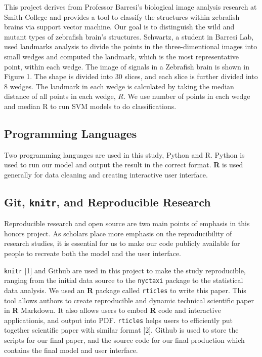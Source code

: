 \documentclass[10pt,letterpaper]{article}
\begin{document}
This project derives from Professor Barresi's biological image analysis
research at Smith College and provides a tool to classify the structures
within zebrafish brains via support vector machine. Our goal is to
distinguish the wild and mutant types of zebrafish brain's structures.
Schwartz, a student in Barresi Lab, used landmarks analysis to divide
the points in the three-dimentional images into small wedges and
computed the landmark, which is the most representative point, within
each wedge. The image of signals in a Zebrafish brain is shown in Figure
1. The shape is divided into 30 slices, and each slice is further
divided into 8 wedges. The landmark in each wedge is calculated by
taking the median distance of all points in each wedge, \(R\). We use
number of points in each wedge and median R to run SVM models to do
classifications.

\subsection{Programming Languages}\label{programming-languages}

Two programming languages are used in this study, Python and R. Python
is used to run our model and output the result in the correct format.
\textbf{R} is used generally for data cleaning and creating interactive
user interface.

\subsection{\texorpdfstring{Git, \texttt{knitr}, and Reproducible
Research}{Git, knitr, and Reproducible Research}}\label{git-knitr-and-reproducible-research}

Reproducible research and open source are two main points of emphasis in
this honors project. As scholars place more emphasis on the
reproducibility of research studies, it is essential for us to make our
code publicly available for people to recreate both the model and the
user interface.

\texttt{knitr} {[}1{]} and Github are used in this project to make the
study reproducible, ranging from the initial data source to the
\texttt{nyctaxi} package to the statistical data analysis. We used an
\textbf{R} package called \texttt{rticles} to write this paper. This
tool allows authors to create reproducible and dynamic technical
scientific paper in \textbf{R} Markdown. It also allows users to embed
\textbf{R} code and interactive applicationis, and output into PDF.
\texttt{rticles} helps users to efficiently put together scientific
paper with similar format {[}2{]}. Github is used to store the scripts
for our final paper, and the source code for our final production which
contains the final model and user interface.
\end{document}
